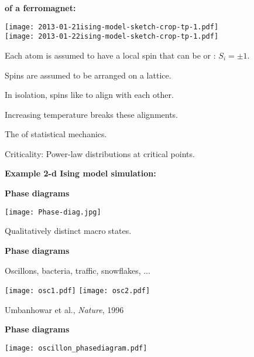 \begin{frame}[plain]
\begin{frame}[plain]

  \textbf{ of a ferromagnet:}
          
      
      \texttt{[image: 2013-01-21ising-model-sketch-crop-tp-1.pdf]}\\
      \texttt{[image: 2013-01-22ising-model-sketch-crop-tp-1.pdf]}
      
      
       
        Each atom is assumed to have a local spin 
        that can be  or : $ S_i = \pm 1$.
       
        Spins are assumed to be arranged on a lattice.
       
        In isolation, spins like to align with each other.
       
        Increasing temperature breaks these alignments.
       
        The  of statistical mechanics.
       
        Criticality: Power-law distributions at critical points.
      
      
      
  \textbf{Example 2-d Ising model simulation:}
  



  \textbf{Phase diagrams}

  \texttt{[image: Phase-diag.jpg]}

  \medskip

  Qualitatively distinct macro states.


  \textbf{Phase diagrams}

  Oscillons, bacteria, traffic, snowflakes, ...

  \medskip
  
  \texttt{[image: osc1.pdf]}
  \texttt{[image: osc2.pdf]}

  \medskip

  Umbanhowar et al., \textit{Nature}, 1996\cite{umbanhowar1996a}


  \textbf{Phase diagrams}

  \begin{center}
    \texttt{[image: oscillon\_phasediagram.pdf]}
  \end{center}



\end{frame}
\end{frame}
